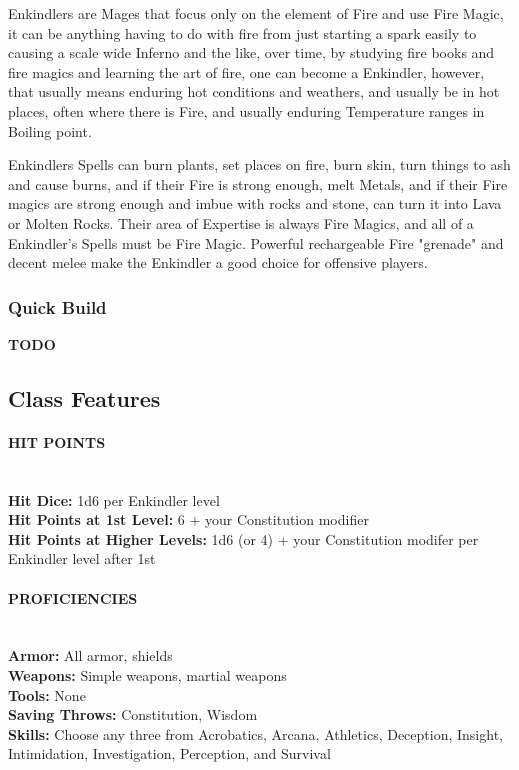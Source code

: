 Enkindlers are Mages that focus only on the element of Fire and use Fire Magic, it can be anything having to do with fire from just starting a spark easily to causing a scale wide Inferno and the like, over time, by studying fire books and fire magics and learning the art of fire, one can become a Enkindler, however, that usually means enduring hot conditions and weathers, and usually be in hot places, often where there is Fire, and usually enduring Temperature ranges in Boiling point.

Enkindlers Spells can burn plants, set places on fire, burn skin, turn things to ash and cause burns, and if their Fire is strong enough, melt Metals, and if their Fire magics are strong enough and imbue with rocks and stone, can turn it into Lava or Molten Rocks. Their area of Expertise is always Fire Magics, and all of a Enkindler's Spells must be Fire Magic. Powerful rechargeable Fire "grenade" and decent melee make the Enkindler a good choice for offensive players.

\newpage

\subsubsection{Quick Build}

\textbf{TODO}

\subsection{Class Features}

\paragraph{HIT POINTS}\mbox{}\\
\textbf{Hit Dice:} 1d6 per Enkindler level\\
\textbf{Hit Points at 1st Level:} 6 + your Constitution modifier\\
\textbf{Hit Points at Higher Levels:} 1d6 (or 4) + your  Constitution modifer per Enkindler level after 1st

\paragraph{PROFICIENCIES}\mbox{}\\
\textbf{Armor:} All armor, shields\\
\textbf{Weapons:} Simple weapons, martial weapons\\
\textbf{Tools:} None\\
\textbf{Saving Throws:} Constitution, Wisdom\\
\textbf{Skills:} Choose any three from Acrobatics, Arcana, Athletics, Deception, Insight, Intimidation, Investigation, Perception, and Survival

